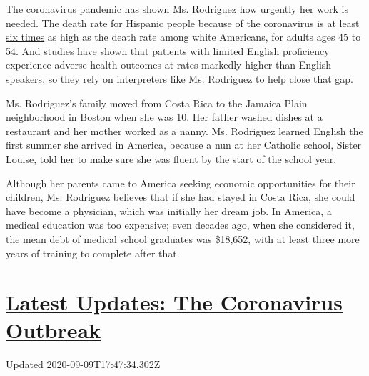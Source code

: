 The coronavirus pandemic has shown Ms. Rodriguez how urgently her work
is needed. The death rate for Hispanic people because of the coronavirus
is at least
\href{https://www.brookings.edu/blog/up-front/2020/06/16/race-gaps-in-covid-19-deaths-are-even-bigger-than-they-appear/}{six
times} as high as the death rate among white Americans, for adults ages
45 to 54. And
\href{https://www.jointcommission.org/assets/1/23/Quick_Safety_Issue_13_May_2015_EMBARGOED_5_27_15.pdf}{studies}
have shown that patients with limited English proficiency experience
adverse health outcomes at rates markedly higher than English speakers,
so they rely on interpreters like Ms. Rodriguez to help close that gap.

Ms. Rodriguez's family moved from Costa Rica to the Jamaica Plain
neighborhood in Boston when she was 10. Her father washed dishes at a
restaurant and her mother worked as a nanny. Ms. Rodriguez learned
English the first summer she arrived in America, because a nun at her
Catholic school, Sister Louise, told her to make sure she was fluent by
the start of the school year.

Although her parents came to America seeking economic opportunities for
their children, Ms. Rodriguez believes that if she had stayed in Costa
Rica, she could have become a physician, which was initially her dream
job. In America, a medical education was too expensive; even decades
ago, when she considered it, the
\href{https://www.nytimes3xbfgragh.onion/1981/11/08/magazine/a-nation-of-doctors-in-debt.html}{mean
debt} of medical school graduates was \$18,652, with at least three more
years of training to complete after that.

\hypertarget{latest-updates-the-coronavirus-outbreak}{%
\section{\texorpdfstring{\href{https://www.nytimes3xbfgragh.onion/2020/09/09/world/covid-19-coronavirus.html?action=click\&pgtype=Article\&state=default\&region=MAIN_CONTENT_1\&context=storylines_live_updates}{Latest
Updates: The Coronavirus
Outbreak}}{Latest Updates: The Coronavirus Outbreak}}\label{latest-updates-the-coronavirus-outbreak}}

Updated 2020-09-09T17:47:34.302Z

